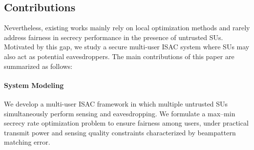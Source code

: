 \documentclass[runningheads]{llncs}
\begin{document}


\subsection{Contributions} 
Nevertheless, existing works mainly rely on local optimization methods and rarely address fairness in secrecy performance in the presence of untrusted SUs. Motivated by this gap, we study a secure multi-user ISAC system where SUs may also act as potential eavesdroppers. The main contributions of this paper are summarized as follows:

\paragraph{System Modeling} We develop a multi-user ISAC framework in which multiple untrusted SUs simultaneously perform sensing and eavesdropping. We formulate a max--min secrecy rate optimization problem to ensure fairness among users, under practical transmit power and sensing quality constraints characterized by beampattern matching error.
\end{document}
